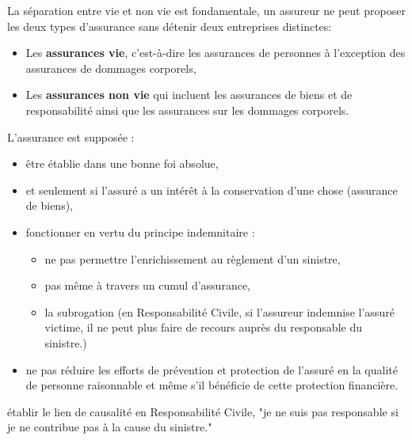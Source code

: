 \begin{f}
	
La séparation entre vie et non vie est fondamentale, un assureur ne peut proposer les deux types d'assurance sans détenir deux entreprises distinctes: 	
\begin{itemize}
	\item Les \textbf{assurances vie}, c'est-à-dire les assurances de personnes à l'exception des assurances de dommages corporels,
	\item Les \textbf{assurances non vie} qui incluent les assurances de biens et de responsabilité ainsi que les assurances sur les dommages corporels. 
\end{itemize}
\end{f}


\begin{f}
	
	
L'assurance est supposée :
	\begin{itemize}
		\item être établie dans une bonne foi absolue,
		\item et seulement si l'assuré a un intérêt à la conservation d'une chose (assurance de biens),
		\item fonctionner en vertu du principe indemnitaire : 
		\begin{itemize}
			\item ne pas permettre l'enrichissement au règlement d'un sinistre,
			\item pas même à travers un cumul d'assurance, 
			\item la subrogation (en Responsabilité Civile, si l'assureur indemnise l'assuré victime, il ne peut plus faire de recours auprès du responsable du sinistre.) 
		\end{itemize}
		\item ne pas réduire les efforts de prévention et protection de l'assuré en la qualité de personne raisonnable et même s'il bénéficie de cette protection financière.
	\end{itemize}
	\item établir le lien de causalité en Responsabilité Civile, "je ne suis pas responsable si je ne contribue pas à la cause du sinistre."
\end{f}


